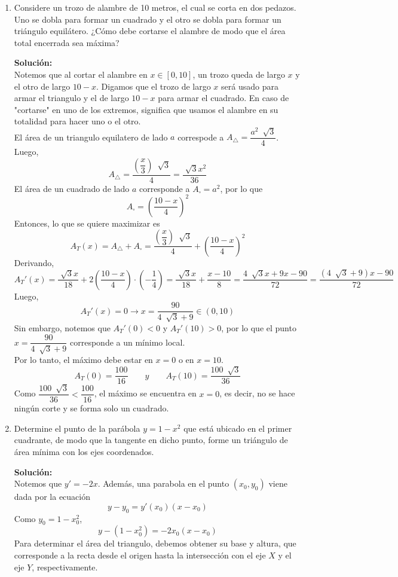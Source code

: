 \documentclass[12pt]{article}
\newenvironment{solucion}
{\begin{mdframed}[backgroundcolor=black!10]
		{\bf Solución:}\\
	}
	{
	\end{mdframed}
}
\newenvironment{preguntas}
{\begin{enumerate}\itemsep12pt
	}
	{
	\end{enumerate}
}
\newcommand{\ra}{\rightarrow}
\begin{document}
\begin{preguntas}
\item Considere un trozo de alambre de 10 metros, el cual se corta en dos pedazos. Uno se dobla para formar un cuadrado y el otro se dobla para formar un triángulo equilátero. ¿Cómo debe cortarse el alambre de modo que el área total encerrada sea máxima?
\begin{solucion}
Notemos que al cortar el alambre en $x \in [0, 10]$, un trozo queda de largo $x$ y el otro de largo $10-x$. Digamos que el trozo de largo $x$ será usado para armar el triangulo y el de largo $10-x$ para armar el cuadrado. En caso de "cortarse" en uno de los extremos, significa que usamos el alambre en su totalidad para hacer uno o el otro.\\

El área de un triangulo equilatero de lado $a$ correspode a $A_\triangle = \dfrac{a^2\ \sqrt[]{3}}{4}$. Luego,
$$A_\triangle = \dfrac{\left(\dfrac{x}{3}\right)\ \sqrt[]{3}}{4} = \dfrac{\sqrt[]{3}x^2}{36}$$
El área de un cuadrado de lado $a$ corresponde a $A_\square = a^2$, por lo que
$$A_\square = \left(\dfrac{10-x}{4}\right)^2$$
Entonces, lo que se quiere maximizar es
$$A_T(x) = A_\triangle + A_\square = \dfrac{\left(\dfrac{x}{3}\right)\ \sqrt[]{3}}{4} + \left(\dfrac{10-x}{4}\right)^2$$
Derivando,
{\small$$A_T'(x) = \dfrac{\sqrt[]{3}x}{18} + 2\left(\dfrac{10-x}{4}\right)\cdot\left(-\dfrac{1}{4}\right) =
\dfrac{\sqrt[]{3}{x}}{18} + \dfrac{x-10}{8} =
\dfrac{4\ \sqrt[]{3}x + 9x - 90}{72} =
\dfrac{(4\ \sqrt[]{3} + 9)x - 90}{72} $$}
Luego,
$$A_T'(x) = 0 \ra x = \dfrac{90}{4\ \sqrt[]{3} + 9} \in (0,10)$$
Sin embargo, notemos que $A_T'(0) < 0$ y $A_T'(10) > 0$, por lo que el punto $x = \dfrac{90}{4\ \sqrt[]{3} + 9}$ corresponde a un mínimo local.\\

Por lo tanto, el máximo debe estar en $x=0$ o en $x=10$.
$$A_T(0) = \dfrac{100}{16} \qquad y \qquad A_T(10) = \dfrac{100\ \sqrt[]{3}}{36}$$
Como $\dfrac{100\ \sqrt[]{3}}{36} < \dfrac{100}{16}$, el máximo se encuentra en $x=0$, es decir, no se hace ningún corte y se forma solo un cuadrado.
\end{solucion}
\item Determine el punto de la parábola $y = 1 - x^2$ que está ubicado en el primer cuadrante, de modo que la tangente en dicho punto, forme un triángulo de área mínima con los ejes coordenados.
\begin{solucion}
Notemos que $y' = -2x$. Además, una parabola en el punto $(x_0, y_0)$ viene dada por la ecuación
$$y-y_0 = y'(x_0)(x-x_0)$$
Como $y_0 = 1-x_0^2$, 
$$y-(1-x_0^2) = -2x_0(x-x_0)$$
Para determinar el área del triangulo, debemos obtener su base y altura, que corresponde a la recta desde el origen hasta la intersección con el eje $X$ y el eje $Y$, respectivamente.\\


\end{solucion}
\end{preguntas}
\end{document}
